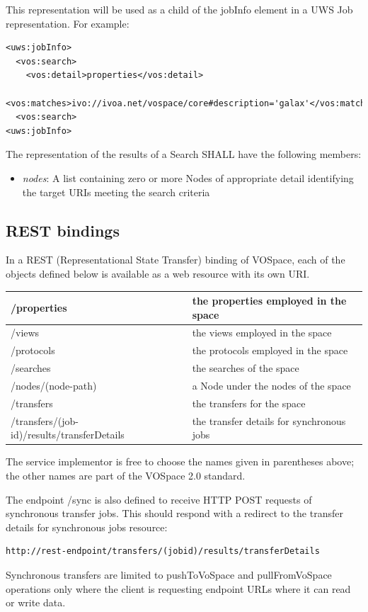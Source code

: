 \documentclass[11pt,a4paper]{ivoa}
\begin{document}
This representation will be used as a child of the jobInfo element in a UWS Job representation. For example:

\begin{lstlisting}
<uws:jobInfo>
  <vos:search>
    <vos:detail>properties</vos:detail>
    <vos:matches>ivo://ivoa.net/vospace/core#description='galax'</vos:matches>
  <vos:search>
<uws:jobInfo>
\end{lstlisting}

The representation of the results of a Search SHALL have the following members:

\begin{itemize}
    \item \emph{nodes}: A list containing zero or more Nodes of appropriate detail identifying the target URIs meeting the search criteria
\end{itemize}

\subsection{REST bindings}
\label{subsec:rest bindings}
In a REST (Representational State Transfer) binding of VOSpace, each of the objects defined below is available as a web resource with its own URI.

\vspace{3mm}
\begin{tabular}{ l p{4cm} }
    \hline
    /properties & the properties employed in the space \\
    \hline
    /views & the views employed in the space \\
    \hline
    /protocols & the protocols employed in the space \\
    \hline
    /searches & the searches of the space \\
    \hline
    /nodes/(node-path) & a Node under the nodes of the space \\
    \hline
    /transfers & the transfers for the space \\
    \hline
    /transfers/(job-id)/results/transferDetails & the transfer details for synchronous jobs \\
    \hline
\end{tabular}
\vspace{3mm}

The service implementor is free to choose the names given in parentheses above; the other names are part of the VOSpace 2.0 standard.

The endpoint /sync is also defined to receive HTTP POST requests of synchronous transfer jobs. This should respond with a redirect to the transfer details for synchronous jobs resource:
\begin{verbatim}
http://rest-endpoint/transfers/(jobid)/results/transferDetails
\end{verbatim}
Synchronous transfers are limited to pushToVoSpace and pullFromVoSpace operations only where the client is requesting endpoint URLs where it can read or write data.
\end{document}
